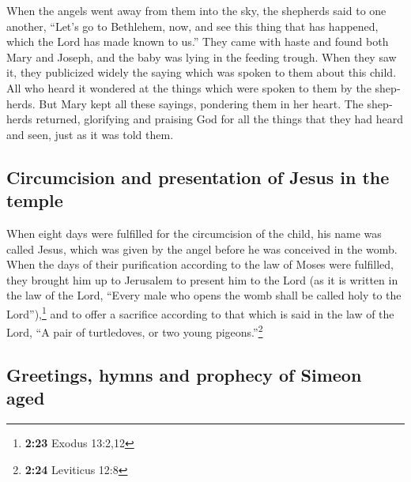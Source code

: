 \begin{paracol}{2}
\begin{otherlanguage}{english}
 When the angels went away from them into the sky, the
shepherds said to one another, ``Let's go to Bethlehem, now, and see
this thing that has happened, which the Lord has made known to us.''
 They came with haste and found both Mary and Joseph, and
the baby was lying in the feeding trough.  When they saw
it, they publicized widely the saying which was spoken to them about
this child.  All who heard it wondered at the things
which were spoken to them by the shepherds.  But Mary
kept all these sayings, pondering them in her heart.  The
shepherds returned, glorifying and praising God for all the things that
they had heard and seen, just as it was told them.

\hypertarget{circumcision-and-presentation-of-jesus-in-the-temple}{%
\subsection{Circumcision and presentation of Jesus in the
temple}\label{circumcision-and-presentation-of-jesus-in-the-temple}}

 When eight days were fulfilled for the circumcision of
the child, his name was called Jesus, which was given by the angel
before he was conceived in the womb.  When the days of
their purification according to the law of Moses were fulfilled, they
brought him up to Jerusalem to present him to the Lord 
(as it is written in the law of the Lord, ``Every male who opens the
womb shall be called holy to the Lord''),\footnote{\textbf{2:23} Exodus
  13:2,12}  and to offer a sacrifice according to that
which is said in the law of the Lord, ``A pair of turtledoves, or two
young pigeons.''\footnote{\textbf{2:24} Leviticus 12:8}

\hypertarget{greetings-hymns-and-prophecy-of-simeon-aged}{%
\subsection{Greetings, hymns and prophecy of Simeon
aged}\label{greetings-hymns-and-prophecy-of-simeon-aged}}


\end{otherlanguage}
\end{paracol}
